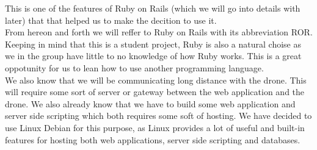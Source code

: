 This is one of the features of Ruby on Rails (which we will go into details with later) that that helped us to make the decition to use it. \\

From hereon and forth we will reffer to Ruby on Rails with its abbreviation ROR. \\

Keeping in mind that this is a student project, Ruby is also a natural choise as we in the group have little to no knowledge of how Ruby works. 
This is a great oppotunity for us to lean how to use another programming language. \\

We also know that we will be communicating long distance with the drone. 
This will require some sort of server or gateway between the web application and the drone.
We also already know that we have to build some web application and server side scripting which both requires some soft of hosting.
We have decided to use Linux Debian for this purpose, as Linux provides a lot of useful and built-in features for hosting both web applications, server side scripting and databases. 
